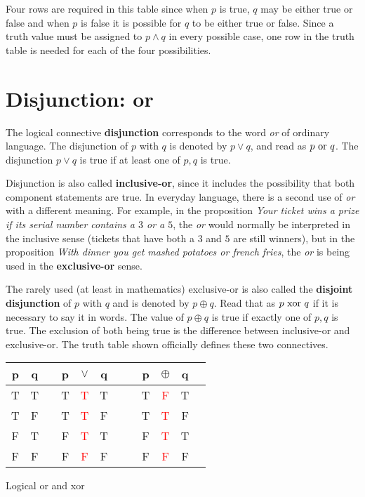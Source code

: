 Four rows are required in this table since when $p$ is true, $q$ may be either true or
false and  when $p$ is false it is possible for $q$ to be either true or false. Since a truth
value must be assigned to $p\land q$ in every possible case, one row in the truth table is needed
for each of the four possibilities. 


\section{Disjunction: \textbf{or}}
The logical connective {\bfseries disjunction} corresponds to the word {\itshape or} of ordinary language. The
disjunction  of $p$ with $q$ is denoted by $p\lor q$, and read as {\itshape $p \hbox{ or }q$}. 
The disjunction $p\lor q$ is true if at least one of $p,q$
is true. 

Disjunction is also called {\bfseries inclusive-or}, since it includes the
possibility that both component statements are true. In everyday language, there is a second use of {\itshape or} with a different meaning.
For example, in the proposition {\itshape Your ticket wins a prize if its serial number contains a $3$ or a $5$}, 
the 
{\itshape or} would
normally be interpreted in the inclusive sense 
(tickets that have both a $3$ and $5$ are still winners),
 but in the proposition {\itshape With dinner you get mashed potatoes or french fries}, the {\itshape or}
is being used in the {\bfseries exclusive-or} sense. %
 
The rarely used (at least in mathematics)   exclusive-or is also called the {\bfseries disjoint disjunction} of $p$ with
$q$ and is denoted by $p\oplus q$. Read that as {\itshape $p\hbox{ xor } q$} if it is necessary to say it in words. 
The value of $p\oplus q$ is true if exactly one of $p,q$ is true. 
The exclusion of both being true is the difference between 
inclusive-or and exclusive-or. The truth table shown officially defines these two connectives. 

\begin{margintable}
\begin{tabular}{@{ }c@{ }@{ }c | c@{ }@{ }c@{ }@{ }c@{ }@{ }c@{ }@{ }c | c@{ }@{ }c@{ }@{ }c@{ }@{ }c@{ }@{ }c}
p & q &  & p & $\lor$ & q &  &  & p & $\oplus$ & q & \\
\hline 
T & T &  & T  & \textcolor{red}{T} & T  &  &  & T & \textcolor{red}{F} & T & \\
T & F &  & T & \textcolor{red}{T} &  F &  &  &  T & \textcolor{red}{T} &  F & \\
F & T &  & F & \textcolor{red}{T} &  T&  &  &  F & \textcolor{red}{T} &  T & \\
F & F &  & F & \textcolor{red}{F} &  F &  &  &  F & \textcolor{red}{F} &  F & \\
\end{tabular}
\caption{Logical or and xor}
\label{tbl:or,xor}
\end{margintable}

